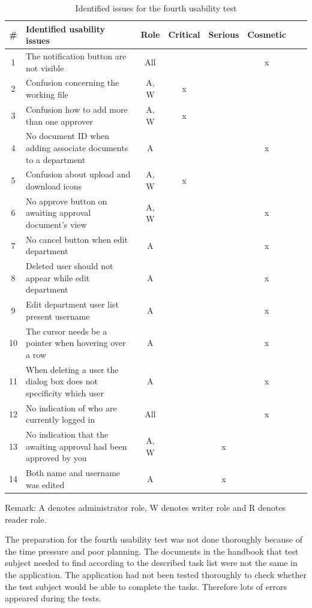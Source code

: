 \begin{table}[H]
	\begin{center}
	\begin{tabular}{| c | m{15em} | c | c | c | c | c | c |}
		\hline
		\# & \textbf{Identified usability issues} & Role & Critical & Serious & Cosmetic \\
		\hline
		 1 & The notification button are not visible & All & & & x \\
		\hline
		 2 & Confusion concerning the working file & A, W & x & & \\
		\hline
		 3 & Confusion how to add more than one approver & A, W & x & & \\
		\hline
		4 & No document ID when adding associate documents to a department & A & & & x\\
		\hline
		5 &  Confusion about upload and download icons & A, W & x &  &\\
		\hline
		6 & No approve button on awaiting approval document's view & A, W &  & & x\\
		\hline
		7 & No cancel button when edit department & A & & & x\\
		\hline
		8 & Deleted user should not appear while edit department & A & & & x \\
		\hline
		9 & Edit department user list present username & A &  & & x \\
		\hline
		10 & The cursor needs be a pointer when hovering over a row & A &  &  & x \\
		\hline
		11 & When deleting a user the dialog box  does not specificity which user & A & & & x\\
		\hline
		12 & No indication of who are currently logged in & All & & & x \\
		\hline
		13 & No indication that the awaiting approval had been approved by you & A, W & & x & \\
		\hline
		14 & Both name and username was edited & A & & x & \\
		\hline
	\end{tabular}
	\end{center}
	 {\raggedright Remark: A denotes administrator role, W denotes writer role and R denotes reader role.\par}
	\caption{Identified issues for the fourth usability test}\label{tab:utest4}
\end{table}

The preparation for the fourth usability test was not done thoroughly because of the time pressure and poor planning.
The documents in the handbook that test subject needed to find according to the  described task list were not the same in the application.
The application had not been tested thoroughly to check whether the test subject would be able to complete the tasks.
Therefore lots of errors appeared during the tests.

